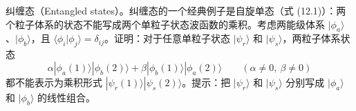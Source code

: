 \begin{question}
纠缠态（Entangled states）。纠缠态的一个经典例子是自旋单态（式 (12.1)）：两个粒子体系的状态不能写成两个单粒子状态波函数的乘积。考虑两能级体系 $|\phi_a\rangle$、$|\phi_b\rangle$，且 $\langle\phi_i|\phi_j\rangle=\delta_{ij}$。证明：对于任意单粒子状态 $|\psi_r\rangle$ 和 $|\psi_s\rangle$，两粒子体系状态
\[
\alpha|\phi_a(1)\rangle|\phi_b(2)\rangle+\beta|\phi_b(1)\rangle|\phi_a(2)\rangle\qquad(\alpha\ne0,\ \beta\ne0)
\]
都不能表示为乘积形式 $|\psi_r(1)\rangle|\psi_s(2)\rangle$。提示：把 $|\psi_r\rangle$ 和 $|\psi_s\rangle$ 分别写成 $|\phi_a\rangle$ 和 $|\phi_b\rangle$ 的线性组合。

\par\smallskip
{}

\end{question}
